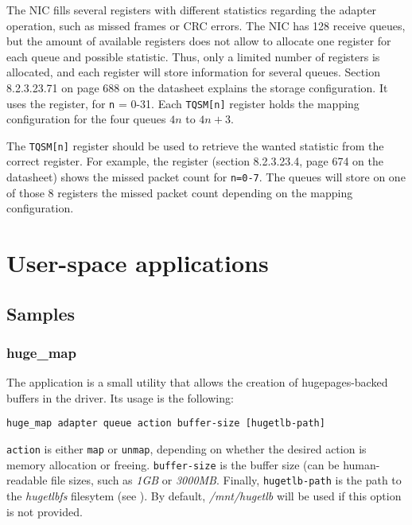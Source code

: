 \documentclass[oneside]{hpman}
\begin{document}
The NIC fills several registers with different statistics regarding the adapter operation, such as missed frames or CRC errors. The NIC has 128 receive queues, but the amount of available registers does not allow to allocate one register for each queue and possible statistic. Thus, only a limited number of registers is allocated, and each register will store information for several queues. Section 8.2.3.23.71 on page 688 on the datasheet explains the storage configuration. It uses the  register, for \texttt{n} = 0-31. Each \texttt{TQSM[n]} register holds the mapping configuration for the four queues $4n$ to $4n + 3$.

The \texttt{TQSM[n]} register should be used to retrieve the wanted statistic from the correct register. For example, the  register (section 8.2.3.23.4, page 674 on the datasheet) shows the missed packet count for \texttt{n=0-7}. The queues will store on one of those 8 registers the missed packet count depending on the mapping configuration.



\chapter{User-space applications}

\section{Samples}
\label{sec:samples}

\subsection{huge\_map}
\label{sec:samples:hugemap}

The  application is a small utility that allows the creation of hugepages-backed buffers in the driver. Its usage is the following:

\begin{verbatim}
huge_map adapter queue action buffer-size [hugetlb-path]
\end{verbatim}

\texttt{action} is either \texttt{map} or \texttt{unmap}, depending on whether the desired action is memory allocation or freeing. \texttt{buffer-size} is the buffer size (can be human-readable file sizes, such as \textit{1GB} or \textit{3000MB}. Finally, \texttt{hugetlb-path} is the path to the \textit{hugetlbfs} filesytem (see ). By default, \textit{/mnt/hugetlb} will be used if this option is not provided.
\end{document}
